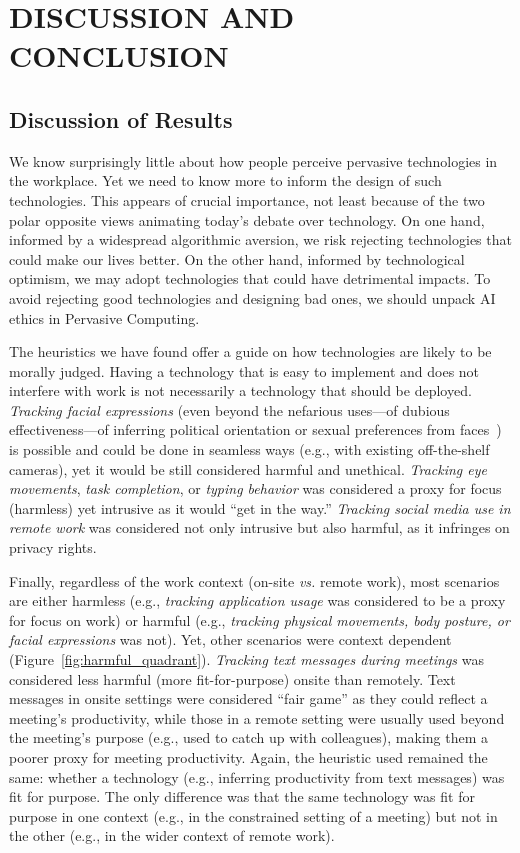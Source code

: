 \section{DISCUSSION AND CONCLUSION}
\label{sec:discussion}

\subsection{Discussion of Results}
We know surprisingly little about how people perceive pervasive technologies in the workplace. Yet we need to know more to inform the design of such technologies. This appears of crucial importance, not least because of the two polar opposite views animating today's debate over technology. On one hand, informed by a widespread algorithmic aversion, we risk rejecting technologies that could make our lives better. On the other hand, informed by technological optimism, we may adopt technologies that could have detrimental impacts. To avoid rejecting good technologies and designing bad ones, we should unpack AI ethics in Pervasive Computing.

The heuristics we have found offer a guide on how technologies are likely to be morally judged. Having a technology that is easy to implement and does not interfere with work is not necessarily a technology that should be deployed. \emph{Tracking facial expressions} (even beyond the nefarious uses---of dubious effectiveness---of inferring political orientation or sexual preferences from faces~\cite{wang2018deep}) is possible and could be done in seamless ways (e.g., with existing off-the-shelf cameras), yet it would be still considered harmful and unethical. \emph{Tracking eye movements}, \emph{task completion}, or \emph{typing behavior} was considered a proxy for focus (harmless) yet intrusive as it would ``get in the way.'' \emph{Tracking social media use in remote work} was considered not only intrusive but also harmful, as it infringes on privacy rights.

Finally, regardless of the work context (on-site \emph{vs.} remote work), most scenarios are either harmless (e.g., \emph{tracking application usage} was considered to be a proxy for focus on work) or harmful (e.g., \emph{tracking physical movements, body posture, or facial expressions} was not). Yet, other scenarios were context dependent (Figure~\ref{fig:harmful_quadrant}). \emph{Tracking text messages during meetings} was considered less harmful (more fit-for-purpose) onsite than remotely. Text messages in onsite settings were considered ``fair game'' as they could reflect a meeting's productivity, while those in a remote setting were usually used beyond the meeting's purpose (e.g., used to catch up with colleagues), making them a poorer proxy for meeting productivity. Again, the heuristic used remained the same: whether a technology (e.g., inferring productivity from text messages) was fit for purpose. The only difference was that the same technology was fit for purpose in one context (e.g., in the constrained setting of a meeting) but not in the other (e.g., in the wider context of remote work).

